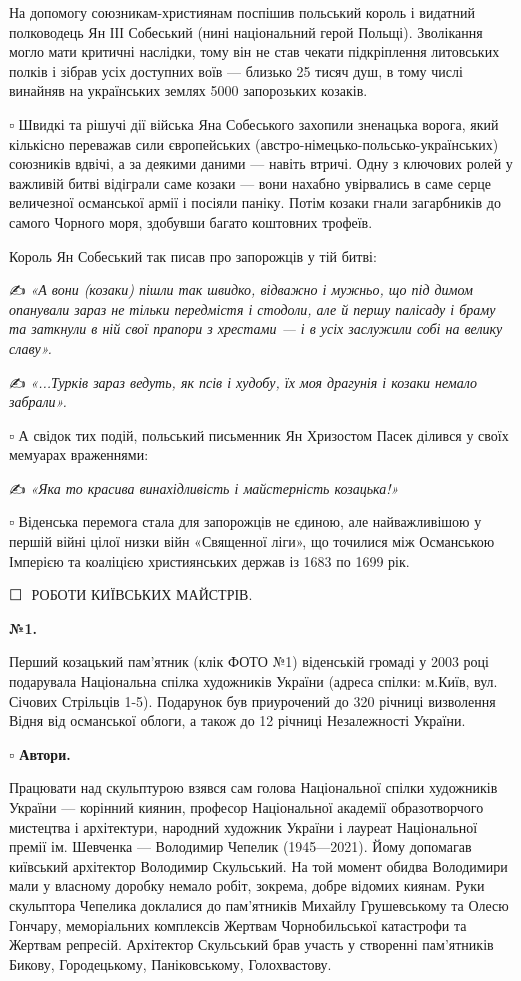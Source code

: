 На допомогу союзникам-християнам поспішив польський король і видатний
полководець Ян ІІІ Собеський (нині національний герой Польщі). Зволікання могло
мати критичні наслідки, тому він не став чекати підкріплення литовських полків
і зібрав усіх доступних воїв — близько 25 тисяч душ, в тому числі винайняв на
українських землях 5000 запорозьких козаків.

▫️ Швидкі та рішучі дії війська Яна Собеського захопили зненацька ворога, який
кількісно переважав сили європейських (австро-німецько-польсько-українських)
союзників вдвічі, а за деякими даними — навіть втричі. Одну з ключових ролей у
важливій битві відіграли саме козаки — вони нахабно увірвались в саме серце
величезної османської армії і посіяли паніку. Потім козаки гнали загарбників до
самого Чорного моря, здобувши багато коштовних трофеїв.

Король Ян Собеський так писав про запорожців у тій битві:

✍️ \emph{«А вони (козаки) пішли так швидко, відважно і мужньо, що під димом опанували
зараз не тільки передмістя і стодоли, але й першу палісаду і браму та заткнули
в ній свої прапори з хрестами — і в усіх заслужили собі на велику славу».}

✍️ \emph{«...Турків зараз ведуть, як псів і худобу, їх моя драгунія і козаки немало
забрали».}

▫️ А свідок тих подій, польський письменник Ян Хризостом Пасек ділився у своїх
мемуарах враженнями:

✍️ \emph{«Яка то красива винахідливість і майстерність козацька!»}

▫️ Віденська перемога стала для запорожців не єдиною, але найважливішою у першій
війні цілої низки війн «Священної ліги», що точилися між Османською Імперією та
коаліцією християнських держав із 1683 по 1699 рік.

⬜️🎁 РОБОТИ КИЇВСЬКИХ МАЙСТРІВ.


\textbf{№1.}

Перший козацький пам'ятник (клік ФОТО №1) віденській громаді у 2003 році
подарувала Національна спілка художників України (адреса спілки: м.Київ, вул.
Січових Стрільців 1-5). Подарунок був приурочений до 320 річниці визволення
Відня від османської облоги, а також до 12 річниці Незалежності України.

\textbf{▫️ Автори.}

Працювати над скульптурою взявся сам голова Національної спілки художників
України — корінний киянин, професор Національної академії образотворчого
мистецтва і архітектури, народний художник України і лауреат Національної
премії ім. Шевченка — Володимир Чепелик (1945—2021). Йому допомагав київський
архітектор Володимир Скульський. На той момент обидва Володимири мали у
власному доробку немало робіт, зокрема, добре відомих киянам. Руки скульптора
Чепелика доклалися до пам'ятників Михайлу Грушевському та Олесю Гончару,
меморіальних комплексів Жертвам Чорнобильської катастрофи та Жертвам репресій.
Архітектор Скульський брав участь у створенні пам'ятників Бикову, Городецькому,
Паніковському, Голохвастову.

